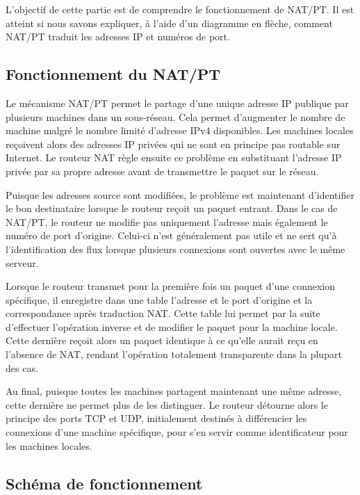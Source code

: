 \documentclass[11pt,a4paper]{article}
\begin{document}
L'objectif de cette partie est de comprendre le fonctionnement de NAT/PT. Il est atteint si nous savons expliquer, à l'aide d'un diagramme en flèche, comment NAT/PT traduit les adresses IP et numéros de port.

\subsection{Fonctionnement du NAT/PT}

Le mécanisme NAT/PT permet le partage d'une unique adresse IP publique par plusieurs machines dans un sous-réseau. Cela permet d'augmenter le nombre de machine malgré le nombre limité d'adresse IPv4 disponibles.
Les machines locales reçoivent alors des adresses IP privées qui ne sont en principe pas routable sur Internet. Le routeur NAT règle ensuite ce problème en substituant l'adresse IP privée par sa propre adresse avant de transmettre le paquet sur le réseau. 

Puisque les adresses source sont modifiées, le problème est maintenant d'identifier le bon destinataire lorsque le routeur reçoit un paquet entrant.
Dans le cas de NAT/PT, le routeur ne modifie pas uniquement l'adresse mais également le numéro de port d'origine. Celui-ci n'est généralement pas utile et ne sert qu'à l'identification des flux lorsque plusieurs connexions sont ouvertes avec le même serveur.

Lorsque le routeur transmet pour la première fois un paquet d'une connexion spécifique, il enregistre dans une table l'adresse et le port d'origine et la correspondance après traduction NAT. Cette table lui permet par la suite d'effectuer l'opération inverse et de modifier le paquet pour la machine locale. Cette dernière reçoit alors un paquet identique à ce qu'elle aurait reçu en l'absence de NAT, rendant l'opération totalement transparente dans la plupart des cas. 

Au final, puisque toutes les machines partagent maintenant une même adresse, cette dernière ne permet plus de les distinguer. Le routeur détourne alors le principe des ports TCP et UDP, initialement destinés à différencier les connexions d'une machine spécifique, pour s'en servir comme identificateur pour les machines locales.

\subsection{Schéma de fonctionnement}
\end{document}
